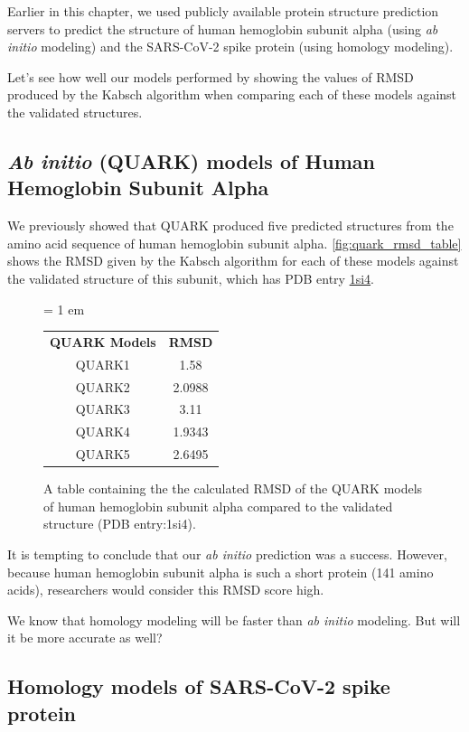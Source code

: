 Earlier in this chapter, we used publicly available protein structure prediction servers to predict the structure of human hemoglobin subunit alpha (using \textit{ab initio} modeling) and the SARS-CoV-2 spike protein (using homology modeling).

Let's see how well our models performed by showing the values of RMSD produced by the Kabsch algorithm when comparing each of these models against the validated structures.

\FloatBarrier
{}
\subsection{\textit{Ab initio} (QUARK) models of Human Hemoglobin Subunit Alpha}

We previously showed that QUARK produced five predicted structures from the amino acid sequence of human hemoglobin subunit alpha. \autoref{fig:quark_rmsd_table} shows the RMSD given by the Kabsch algorithm for each of these models against the validated structure of this subunit, which has PDB entry \href{https://www.rcsb.org/structure/1si4}{1si4}.\\

\begin{figure}[h]
	\centering
	\tabcolsep = 1 em
	\mySfFamily
	\begin{tabular}{c c}
		\textbf{QUARK Models} & \textbf{RMSD} \\
		QUARK1 & 1.58 \\
		QUARK2 & 2.0988 \\
		QUARK3 & 3.11 \\
		QUARK4 & 1.9343 \\
		QUARK5 & 2.6495 \\
	\end{tabular}
	\caption{A table containing the the calculated RMSD of the QUARK models of human hemoglobin subunit alpha compared to the validated structure (PDB entry:1si4).}
	\label{fig:quark_rmsd_table}
\end{figure}

It is tempting to conclude that our \textit{ab initio} prediction was a success. However, because human hemoglobin subunit alpha is such a short protein (141 amino acids), researchers would consider this RMSD score high.

We know that homology modeling will be faster than \textit{ab initio} modeling. But will it be more accurate as well?

\FloatBarrier
{}
\subsection{Homology models of SARS-CoV-2 spike protein}

